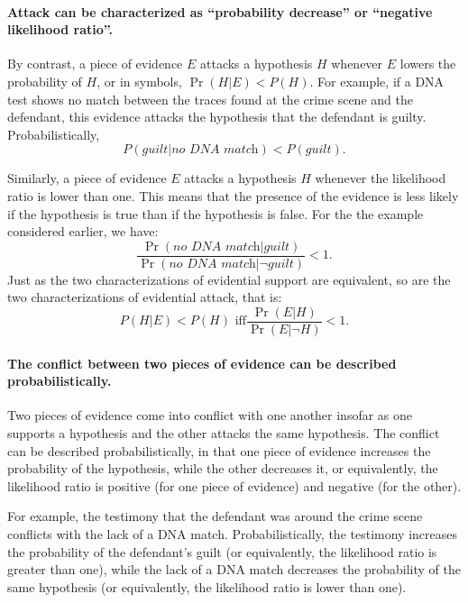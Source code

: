 \documentclass[10pt]{article}
\begin{document}
\paragraph{Attack can be characterized as ``probability decrease'' or ``negative likelihood ratio''.} 

By contrast, a piece of evidence $E$ attacks a hypothesis $H$ whenever $E$ lowers 
the probability of $H$, or in symbols, $\Pr(H|E) < P(H)$.
For example, if a DNA test shows no match between the traces found at the crime
 scene and the defendant, this evidence attacks the hypothesis that the defendant is guilty. 
 Probabilistically, 
%
\[ P(\textit{guilt}|\textit{no DNA match}) < P(\textit{guilt}).\] 
%

\noindent Similarly, a piece of evidence $E$ attacks a hypothesis $H$ whenever 
the likelihood ratio is lower than one. This means that the presence of the evidence is less likely %
if the hypothesis is true than if the hypothesis is false. For the the example 
considered earlier, we have:
 \[\frac{\Pr(\textit{no DNA match}|\textit{guilt})}{\Pr(\textit{no DNA match}|\neg \textit{guilt})} < 1.\]
%
Just as the two characterizations 
of evidential support are equivalent, so are the two characterizations of evidential attack, 
that is:
\[ P(H|E) < P(H) \text{ iff} \frac{\Pr(E|H)}{\Pr(E|\neg H)} < 1.\]
%

\paragraph{The conflict between two pieces of evidence can be described probabilistically.}
Two pieces of evidence come into 
conflict with one another insofar as one supports a hypothesis 
and the other attacks the same hypothesis. 
The conflict can be described probabilistically, in that one piece of evidence increases 
the probability of the hypothesis, while the other decreases it, or equivalently, the likelihood ratio is positive (for one piece 
of evidence) and negative (for the other). 

For example, the testimony that the defendant was around the crime scene conflicts 
with the lack of a DNA match. Probabilistically, the testimony 
increases the probability of the defendant's guilt (or equivalently, the likelihood ratio is greater than one),
while the lack of a DNA match decreases the probability of the same hypothesis 
(or equivalently, the likelihood ratio is lower than one).
\end{document}
